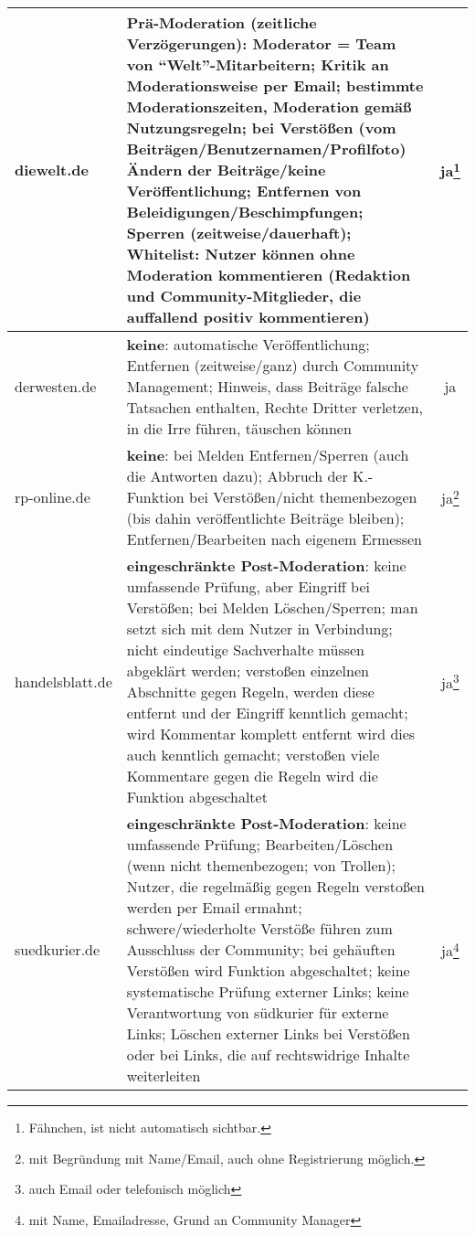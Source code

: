 \begin{landscape}
\begin{longtable}{lp{135mm}c}
diewelt.de
& {\bfseries Prä-Moderation} (zeitliche Verzögerungen): Moderator = Team von
  ``Welt''-Mitarbeitern; Kritik an Moderationsweise per Email; bestimmte
  Moderationszeiten, Moderation gemäß Nutzungsregeln; bei Verstößen (vom
  Beiträgen/Benutzernamen/Profilfoto) Ändern der Beiträge/keine
  Veröffentlichung; Entfernen von Beleidigungen/Beschimpfungen; Sperren
  (zeitweise/dauerhaft); Whitelist: Nutzer können ohne Moderation kommentieren
  (Redaktion und Community-Mitglieder, die auffallend positiv kommentieren)
& ja\footnote{Fähnchen, ist nicht automatisch sichtbar.}
\\\midrule

derwesten.de
& {\bfseries keine}: automatische Veröffentlichung; Entfernen (zeitweise/ganz)
  durch Community Management; Hinweis, dass Beiträge falsche Tatsachen
  enthalten, Rechte Dritter verletzen, in die Irre führen, täuschen können
& ja
\\\midrule

rp-online.de
& {\bfseries keine}: bei Melden Entfernen/Sperren (auch die Antworten dazu);
  Abbruch der K.-Funktion bei Verstößen/nicht themenbezogen (bis dahin
  veröffentlichte Beiträge bleiben); Entfernen/Bearbeiten nach eigenem Ermessen
& ja\footnote{mit Begründung mit Name/Email, auch ohne Registrierung möglich.}
\\\midrule

handelsblatt.de
& {\bfseries eingeschränkte Post-Moderation}: keine umfassende Prüfung, aber
  Eingriff bei Verstößen;  bei Melden Löschen/Sperren; man setzt sich mit dem
  Nutzer in Verbindung; nicht eindeutige Sachverhalte müssen abgeklärt werden;
  verstoßen einzelnen Abschnitte gegen Regeln, werden diese entfernt und der
  Eingriff kenntlich gemacht; wird Kommentar komplett entfernt wird dies auch
  kenntlich gemacht; verstoßen viele Kommentare gegen die Regeln wird die
  Funktion abgeschaltet
& ja\footnote{auch Email oder telefonisch möglich}
\\\midrule

suedkurier.de
& {\bfseries eingeschränkte Post-Moderation}: keine umfassende Prüfung;
  Bearbeiten/Löschen (wenn nicht themenbezogen; von Trollen); Nutzer, die
  regelmäßig gegen Regeln verstoßen werden per Email ermahnt;
  schwere/wiederholte Verstöße führen zum Ausschluss der Community; bei
  gehäuften Verstößen wird Funktion abgeschaltet; keine systematische Prüfung
  externer Links; keine Verantwortung von südkurier für externe Links; Löschen
  externer Links bei Verstößen oder bei Links, die auf rechtswidrige Inhalte
  weiterleiten
& ja\footnote{mit Name, Emailadresse, Grund an Community Manager}
\\\midrule


\end{longtable}
\end{landscape}
